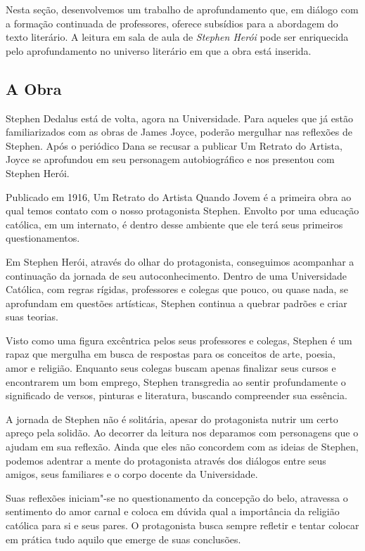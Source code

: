 \documentclass[12pt]{extarticle}
\begin{document}
{Nesta seção, desenvolvemos um trabalho de aprofundamento que, em diálogo
com a formação continuada de professores, oferece subsídios para a
abordagem do texto literário. A leitura em sala de aula de \emph{Stephen
Herói} pode ser enriquecida pelo aprofundamento no universo literário em
que a obra está inserida.

\subsection{A Obra}

Stephen Dedalus está de volta, agora na Universidade. Para aqueles que
já estão familiarizados com as obras de James Joyce, poderão mergulhar
nas reflexões de Stephen. Após o periódico Dana se recusar a publicar Um
Retrato do Artista, Joyce se aprofundou em seu personagem autobiográfico
e nos presentou com Stephen Herói.

Publicado em 1916, Um Retrato do Artista Quando Jovem é a primeira obra
ao qual temos contato com o nosso protagonista Stephen. Envolto por uma
educação católica, em um internato, é dentro desse ambiente que ele terá
seus primeiros questionamentos.

Em Stephen Herói, através do olhar do protagonista, conseguimos
acompanhar a continuação da jornada de seu autoconhecimento. Dentro de
uma Universidade Católica, com regras rígidas, professores e colegas que
pouco, ou quase nada, se aprofundam em questões artísticas, Stephen
continua a quebrar padrões e criar suas teorias.

Visto como uma figura excêntrica pelos seus professores e colegas,
Stephen é um rapaz que mergulha em busca de respostas para os conceitos
de arte, poesia, amor e religião. Enquanto seus colegas buscam apenas
finalizar seus cursos e encontrarem um bom emprego, Stephen transgredia
ao sentir profundamente o significado de versos, pinturas e literatura,
buscando compreender sua essência.

A jornada de Stephen não é solitária, apesar do protagonista nutrir um
certo apreço pela solidão. Ao decorrer da leitura nos deparamos com
personagens que o ajudam em sua reflexão. Ainda que eles não concordem
com as ideias de Stephen, podemos adentrar a mente do protagonista
através dos diálogos entre seus amigos, seus familiares e o corpo
docente da Universidade.

Suas reflexões iniciam"-se no questionamento da concepção do belo,
atravessa o sentimento do amor carnal e coloca em dúvida qual a
importância da religião católica para si e seus pares. O protagonista
busca sempre refletir e tentar colocar em prática tudo aquilo que emerge
de suas conclusões.

}
\end{document}
